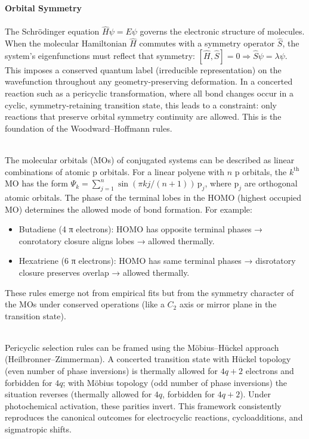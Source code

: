 \begin{technical}
{\Large\textbf{Orbital Symmetry}}\\[0.4em]

\\[0.3em]
The Schrödinger equation \( \hat{H}\psi = E\psi \) governs the electronic structure of molecules. When the molecular Hamiltonian \( \hat{H} \) commutes with a symmetry operator \( \hat{S} \), the system's eigenfunctions must reflect that symmetry: \([\hat{H}, \hat{S}] = 0 \Rightarrow \hat{S}\psi = \lambda\psi\). This imposes a conserved quantum label (irreducible representation) on the wavefunction throughout any geometry-preserving deformation. In a concerted reaction such as a pericyclic transformation, where all bond changes occur in a cyclic, symmetry-retaining transition state, this leads to a constraint: only reactions that preserve orbital symmetry continuity are allowed. This is the foundation of the Woodward–Hoffmann rules.

\\[0.3em]
The molecular orbitals (MOs) of conjugated systems can be described as linear combinations of atomic $\mathrm{p}$ orbitals. For a linear polyene with \( n \) $\mathrm{p}$ orbitals, the \( k^\text{th} \) MO has the form \(\Psi_k = \sum_{j=1}^n \sin(\pi k j/(n+1))\, \mathrm{p}_j\), where \( \mathrm{p}_j \) are orthogonal atomic orbitals. The phase of the terminal lobes in the HOMO (highest occupied MO) determines the allowed mode of bond formation. For example:
\begin{itemize}
\item Butadiene (4 π electrons): HOMO has opposite terminal phases → conrotatory closure aligns lobes → allowed thermally.
\item Hexatriene (6 π electrons): HOMO has same terminal phases → disrotatory closure preserves overlap → allowed thermally.
\end{itemize}
These rules emerge not from empirical fits but from the symmetry character of the MOs under conserved operations (like a \( C_2 \) axis or mirror plane in the transition state).

\\[0.3em]
Pericyclic selection rules can be framed using the Möbius–Hückel approach (Heilbronner–Zimmerman). A concerted transition state with Hückel topology (even number of phase inversions) is thermally allowed for \(4q+2\) electrons and forbidden for \(4q\); with Möbius topology (odd number of phase inversions) the situation reverses (thermally allowed for \(4q\), forbidden for \(4q+2\)). Under photochemical activation, these parities invert. This framework consistently reproduces the canonical outcomes for electrocyclic reactions, cycloadditions, and sigmatropic shifts.


\end{technical}

